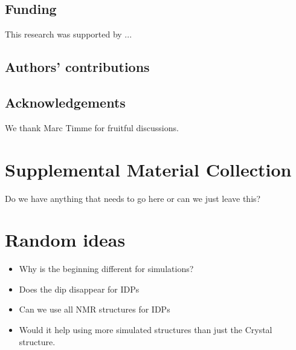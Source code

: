\documentclass[
reprint,
twocolumn,
amsmath,amssymb,superscriptaddress,aps,
pre]{revtex4-1}
\newcommand{\red}[1]{\textcolor{red!80!black}{#1}}
\begin{document}
\subsection{Funding}
This research was supported by ...
\subsection{Authors' contributions}

\subsection{Acknowledgements}
We thank Marc Timme for fruitful discussions.




\appendix
\section{Supplemental Material Collection}
\red{Do we have anything that needs to go here or can we just leave this?}
\section{Random ideas}
\begin{itemize}
    \item Why is the beginning different for simulations?
    \item Does the dip disappear for IDPs
    \item Can we use all NMR structures for IDPs
    \item Would it help using more simulated structures than just the Crystal structure. 
\end{itemize}
\end{document}

